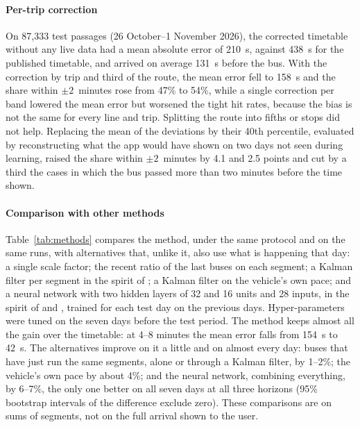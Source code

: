 \paragraph{Per-trip correction} On 87,333 test passages (26 October--1 November 2026), the corrected timetable without
any live data had a mean absolute error of 210~s, against 438~s for the published timetable, and arrived on average
131~s before the bus. With the correction by trip and third of the route, the mean error fell to 158~s and the share
within $\pm2$~minutes rose from 47\% to 54\%, while a single correction per band lowered the mean error but worsened
the tight hit rates, because the bias is not the same for every line and trip. Splitting the route into fifths or stops
did not help. Replacing the mean of the deviations by their 40th percentile, evaluated by reconstructing what the app
would have shown on two days not seen during learning, raised the share within $\pm2$~minutes by 4.1 and 2.5 points
and cut by a third the cases in which the bus passed more than two minutes before the time shown.

\paragraph{Comparison with other methods} Table~\ref{tab:methods} compares the method, under the same protocol and on
the same runs, with alternatives that, unlike it, also use what is happening that day: a single scale factor; the
recent ratio of the last buses on each segment; a Kalman filter per segment in the spirit of \textcite{shalaby2004};
a Kalman filter on the vehicle's own pace; and a neural network with two hidden layers of 32 and 16 units and 28
inputs, in the spirit of \textcite{chien2002} and \textcite{jeong2005}, trained for each test day on the previous days.
Hyper-parameters were tuned on the seven days before the test period. The method keeps almost all the gain over the
timetable: at 4--8 minutes the mean error falls from 154~s to 42~s. The alternatives improve on it a little and on
almost every day: buses that have just run the same segments, alone or through a Kalman filter, by 1--2\%; the
vehicle's own pace by about 4\%; and the neural network, combining everything, by 6--7\%, the only one better on all
seven days at all three horizons (95\% bootstrap intervals of the difference exclude zero). These comparisons are on
sums of segments, not on the full arrival shown to the user.

